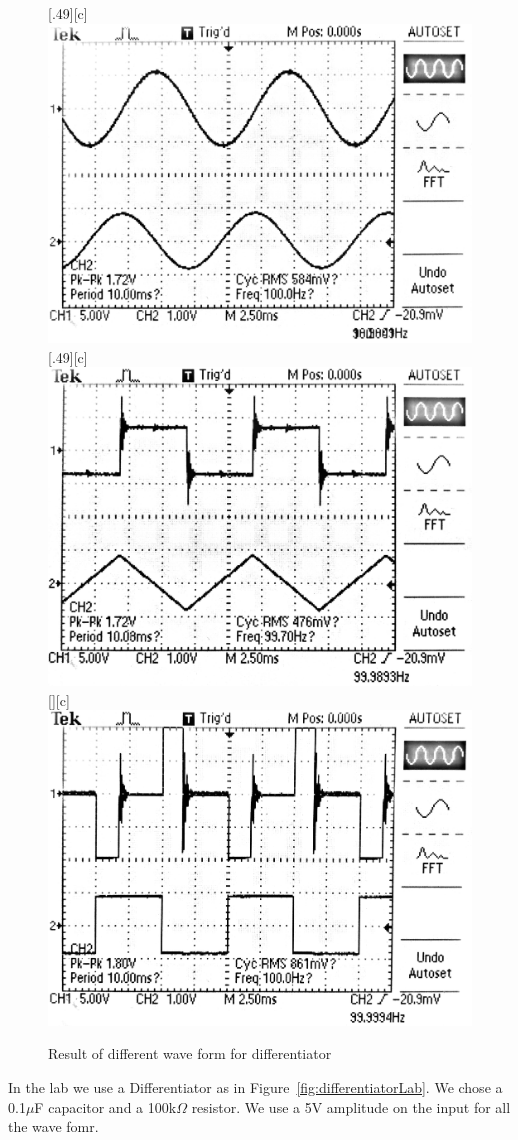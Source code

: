 \documentclass[aps,prl,reprint]{revtex4-1}
\begin{document}
        \begin{figure}[b]
            \centering
            [.49\linewidth][c]{%
                \includegraphics[width=.49\linewidth]{image/differentiator/sine.pdf}}
            [.49\linewidth][c]{%
                \includegraphics[width=.49\linewidth]{image/differentiator/tri.pdf}}
            [\linewidth][c]{%
                \includegraphics[width=.8\linewidth]{image/differentiator/sqr.pdf}}
            \caption{Result of different wave form for differentiator}
            \label{fig:differentiatorWave}
        \end{figure}
        In the lab we use a Differentiator as in Figure~\ref{fig:differentiatorLab}. We chose a 0.1$\mu$F capacitor and a 100k$\Omega$ resistor. We use a 5V amplitude on the input for all the wave fomr.
\end{document}
